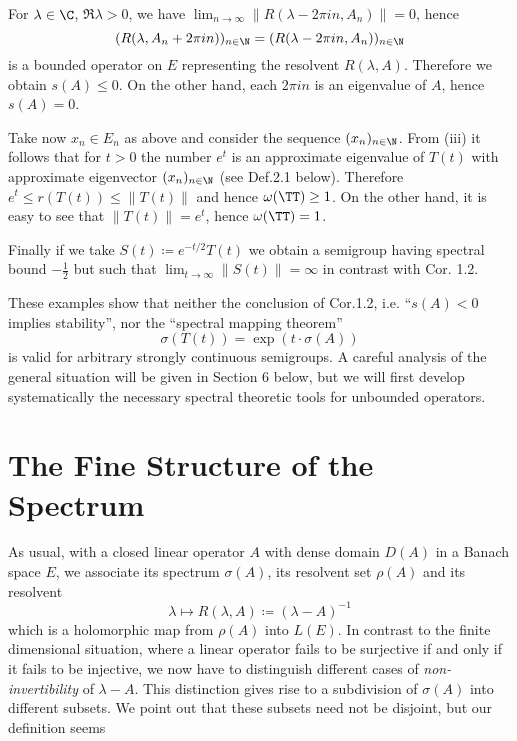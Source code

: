 For $\lambda \in \C$, $\Re\lambda > 0$, we have $\lim_{n \to \infty} \|R(\lambda-2\pi in,A_{n})\| = 0$, hence
\[
    (R(\lambda,A_{n}+2\pi in))_{n \in \N} = (R(\lambda-2\pi in,A_{n}))_{n \in \N}
\]
is a bounded operator on $E$ representing the resolvent $R(\lambda,A)$.
Therefore we obtain $s(A) \leq 0$.
On the other hand, each $2\pi in$ is an eigenvalue of $A$, hence $s(A) = 0$.

Take now $x_{n} \in E_{n}$ as above and consider the sequence $(x_{n})_{n \in \N}$.
From (iii) it follows that for $t > 0$ the number $e^{t}$ is an approximate eigenvalue of $T(t)$ with approximate eigenvector $(x_{n})_{n \in \N}$ (see Def.2.1 below).
Therefore $e^{t} \leq r(T(t)) \leq \|T(t)\|$ and hence $\omega(\TT) \geq 1$.
On the other hand, it is easy to see that $\|T(t)\| = e^{t}$, hence $\omega(\TT) = 1$.


Finally if we take $S(t) \coloneqq e^{-t/2}T(t)$ we obtain a semigroup having spectral bound $-\frac{1}{2}$ but such that $\lim_{t \to \infty} \|S(t)\| = \infty$ in contrast with Cor. 1.2.

These examples show that neither the conclusion of Cor.1.2, i.e. \enquote{$s(A) < 0$ implies stability}, nor the \enquote{spectral mapping theorem}
\[
    \sigma(T(t)) = \exp(t\cdot\sigma(A))
\]
is valid for arbitrary strongly continuous semigroups.
A careful analysis of the general situation will be given in Section 6 below, but we will first develop systematically the necessary spectral theoretic tools for unbounded operators.
\section{The Fine Structure of the Spectrum}\label{sec:a3-2}

As usual, with a closed linear operator $A$ with dense domain $D(A)$ in a Banach space $E$, we associate its spectrum $\sigma(A)$, its resolvent set $\rho(A)$ and its resolvent
\[
    \lambda \mapsto R(\lambda,A) \coloneqq (\lambda - A)^{-1}
\]
which is a holomorphic map from $\rho(A)$ into $L(E)$.
In contrast to the finite dimensional situation, where a linear operator fails to be surjective if and only if it fails to be injective, we now have to distinguish different cases of \emph{non-invertibility} of $\lambda - A$.
This distinction gives rise to a subdivision of $\sigma(A)$ into different subsets.
We point out that these subsets need not be disjoint, but our definition seems


